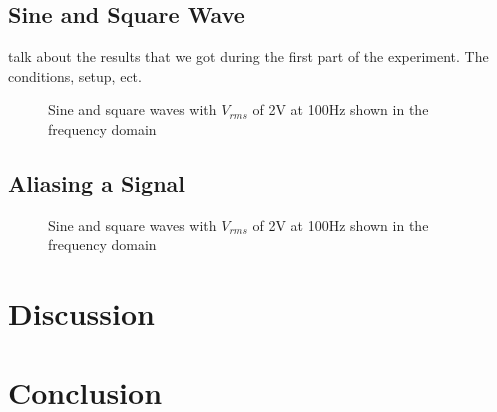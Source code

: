 \documentclass[letterpaper,12pt]{article}
\begin{document}
\subsection{Sine and Square Wave}
talk about the results that we got during the first part of the experiment. The conditions, setup, ect.
\begin{figure}[ht]
\centering
{}
\quad
{}
\caption{Sine and square waves with $V_{rms}$ of 2V at 100Hz shown in the frequency domain}
\end{figure}

\subsection{Aliasing a Signal}
\begin{figure}[ht]
\centering
{}
\quad
{}
\caption{Sine and square waves with $V_{rms}$ of 2V at 100Hz shown in the frequency domain}
\end{figure}


\section{Discussion}

\section{Conclusion}
\end{document}
